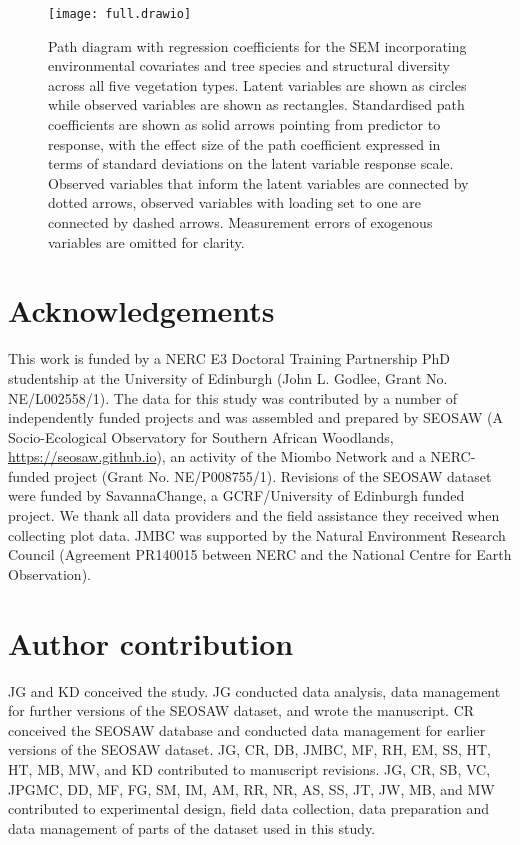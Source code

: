 \documentclass[11pt,a4paper]{article}
\begin{document}
\begin{figure}[H]
\centering
	\texttt{[image: full.drawio]}
	\caption{Path diagram with regression coefficients for the SEM incorporating environmental covariates and tree species and structural diversity across all five vegetation types. Latent variables are shown as circles while observed variables are shown as rectangles. Standardised path coefficients are shown as solid arrows pointing from predictor to response, with the effect size of the path coefficient expressed in terms of standard deviations on the latent variable response scale. Observed variables that inform the latent variables are connected by dotted arrows, observed variables with loading set to one are connected by dashed arrows. Measurement errors of exogenous variables are omitted for clarity.}
	\label{full_mod}
\end{figure}
\newpage{}

\section{Acknowledgements}

This work is funded by a NERC E3 Doctoral Training Partnership PhD studentship at the University of Edinburgh (John L. Godlee, Grant No. NE/L002558/1). The data for this study was contributed by a number of independently funded projects and was assembled and prepared by SEOSAW (A Socio-Ecological Observatory for Southern African Woodlands, \url{https://seosaw.github.io}), an activity of the Miombo Network and a NERC-funded project (Grant No. NE/P008755/1). Revisions of the SEOSAW dataset were funded by SavannaChange, a GCRF/University of Edinburgh funded project. We thank all data providers and the field assistance they received when collecting plot data. JMBC was supported by the Natural Environment Research Council (Agreement PR140015 between NERC and the National Centre for Earth Observation). 

\section{Author contribution}

JG and KD conceived the study. JG conducted data analysis, data management for further versions of the SEOSAW dataset, and wrote the manuscript. CR conceived the SEOSAW database and conducted data management for earlier versions of the SEOSAW dataset. JG, CR, DB, JMBC, MF, RH, EM, SS, HT, HT, MB, MW, and KD contributed to manuscript revisions. JG, CR, SB, VC, JPGMC, DD, MF, FG, SM, IM, AM, RR, NR, AS, SS, JT, JW, MB, and MW contributed to experimental design, field data collection, data preparation and data management of parts of the dataset used in this study. 
\end{document}
